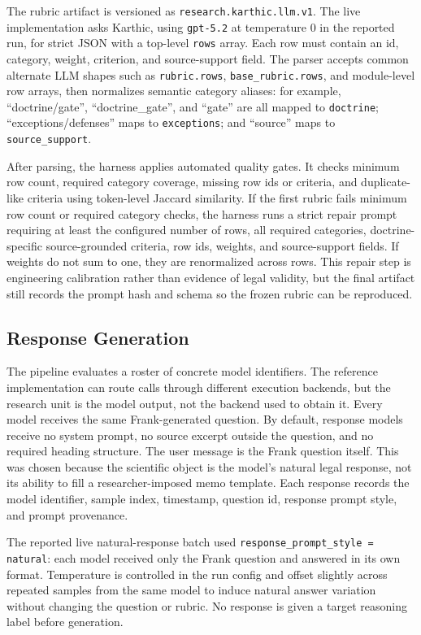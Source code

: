 The rubric artifact is versioned as \texttt{research.karthic.llm.v1}. The live
implementation asks Karthic, using \texttt{gpt-5.2} at temperature 0 in the
reported run, for strict JSON with a top-level \texttt{rows} array. Each row
must contain an id, category, weight, criterion, and source-support field. The
parser accepts common alternate LLM shapes such as \texttt{rubric.rows},
\texttt{base\_rubric.rows}, and module-level row arrays, then normalizes
semantic category aliases: for example, ``doctrine/gate'',
``doctrine\_gate'', and ``gate'' are all mapped to \texttt{doctrine};
``exceptions/defenses'' maps to \texttt{exceptions}; and ``source'' maps to
\texttt{source\_support}.

After parsing, the harness applies automated quality gates. It checks minimum
row count, required category coverage, missing row ids or criteria, and
duplicate-like criteria using token-level Jaccard similarity. If the first
rubric fails minimum row count or required category checks, the harness runs a
strict repair prompt requiring at least the configured number of rows, all
required categories, doctrine-specific source-grounded criteria, row ids,
weights, and source-support fields. If weights do not sum to one, they are
renormalized across rows. This repair step is engineering calibration rather
than evidence of legal validity, but the final artifact still records the prompt
hash and schema so the frozen rubric can be reproduced.

\subsection{Response Generation}

The pipeline evaluates a roster of concrete model identifiers. The reference
implementation can route calls through different execution backends, but the
research unit is the model output, not the backend used to obtain it. Every
model receives the same Frank-generated question. By default, response models
receive no system prompt, no source excerpt outside the question, and no required
heading structure. The user message is the Frank question itself. This was
chosen because the scientific object is the model's natural legal response, not
its ability to fill a researcher-imposed memo template. Each response records
the model identifier, sample index, timestamp, question id, response prompt
style, and prompt provenance.

The reported live natural-response batch used
\texttt{response\_prompt\_style = natural}: each model received only the Frank
question and answered in its own format. Temperature is controlled in the run
config and offset slightly across repeated samples from the same model to induce
natural answer variation without changing the question or rubric. No response is
given a target reasoning label before generation.

